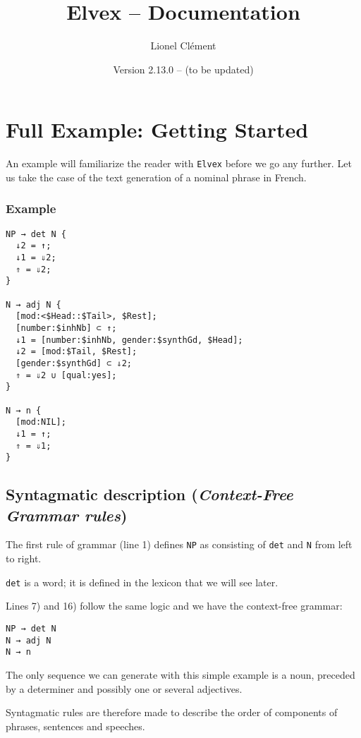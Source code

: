 \documentclass[11pt]{article}
\title{Elvex -- Documentation}
\author{Lionel Clément}
\date{Version 2.13.0 --  (to be updated)}
\begin{document}
\maketitle



\section{Full Example: Getting Started}

An example will familiarize the reader with \texttt{Elvex} before we
go any further. Let us take the case of the text generation of a
nominal phrase in French.

\subsubsection*{Example}

\begin{lstlisting}
NP → det N {
  ↓2 = ↑;
  ↓1 = ⇓2;
  ⇑ = ⇓2;
}

N → adj N {
  [mod:<$Head::$Tail>, $Rest];
  [number:$inhNb] ⊂ ↑;
  ↓1 = [number:$inhNb, gender:$synthGd, $Head];
  ↓2 = [mod:$Tail, $Rest];
  [gender:$synthGd] ⊂ ⇓2;
  ⇑ = ⇓2 ∪ [qual:yes];
}

N → n {
  [mod:NIL];
  ↓1 = ↑;
  ⇑ = ⇓1;
}
\end{lstlisting}

\subsection{Syntagmatic description (\textit{Context-Free Grammar rules})}
 
The first rule of grammar (line 1) defines \texttt{NP} as
consisting of \texttt{det} and \texttt{N} from left to right.

\texttt{det} is a word; it is defined in the lexicon that we will see
later.

Lines 7) and 16) follow the same logic and we have the
context-free grammar:

\begin{lstlisting}[numbers=none]
NP → det N
N → adj N
N → n
\end{lstlisting}

The only sequence we can generate with this simple example is
a noun, preceded by a determiner and possibly one or several adjectives.

Syntagmatic rules are therefore made to describe the order of
components of phrases, sentences and speeches.
\end{document}

